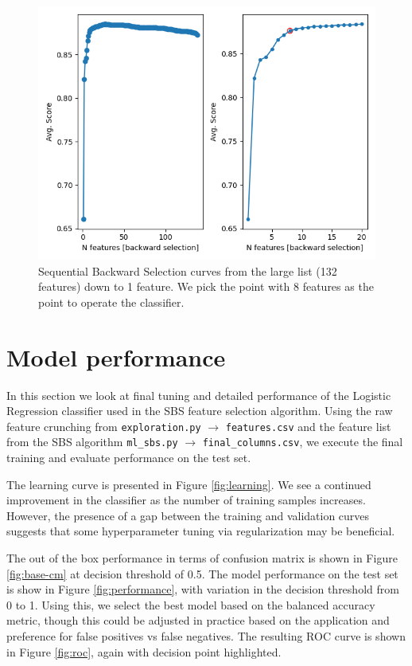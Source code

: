 \documentclass[12pt]{article}
\begin{document}
\begin{figure}
\centering
\includegraphics[width=1\textwidth]{ml_sbs_avg_score_products.png}
\caption{Sequential Backward Selection curves from the large list (132 features) down to 1 feature. We pick the point with 8 features as the point to operate the classifier. }
\label{fig:sbs}
\end{figure}
\section{Model performance}
In this section we look at final tuning and detailed performance of the Logistic Regression classifier used in the SBS feature selection algorithm. Using the raw feature crunching from \verb|exploration.py| $\rightarrow$ \verb|features.csv| and the feature list from the SBS algorithm \verb|ml_sbs.py| $\rightarrow$ \verb|final_columns.csv|, we execute the final training and evaluate performance on the test set. 

The learning curve is presented in Figure \ref{fig:learning}. We see a continued improvement in the classifier as the number of training samples increases. However, the presence of a gap between the training and validation curves suggests that some hyperparameter tuning via regularization may be beneficial. 

The out of the box performance in terms of confusion matrix is shown in Figure \ref{fig:base-cm} at decision threshold of 0.5. The model performance on the test set is show in Figure \ref{fig:performance}, with variation in the decision threshold from 0 to 1. Using this, we select the best model based on the balanced accuracy metric, though this could be adjusted in practice based on the application and preference for false positives vs false negatives. The resulting ROC curve is shown in Figure \ref{fig:roc}, again with decision point highlighted. 
\end{document}
